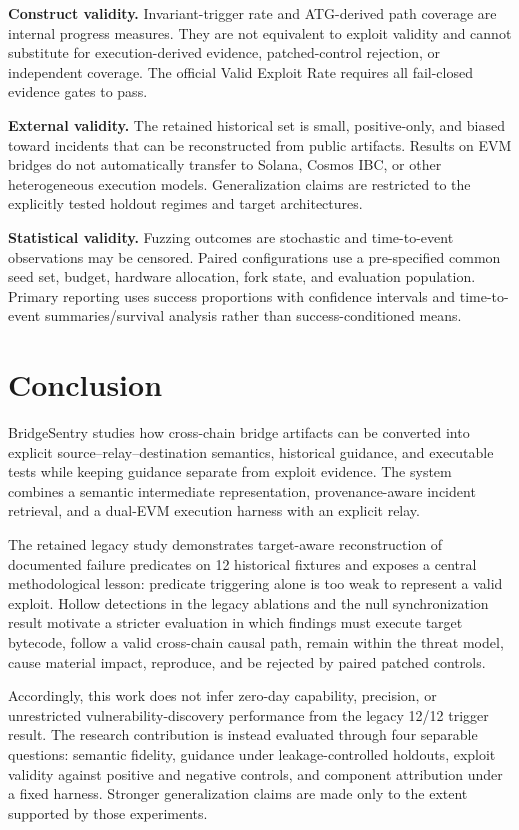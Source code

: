\textbf{Construct validity.} Invariant-trigger rate and ATG-derived path coverage are internal progress measures. They are not equivalent to exploit validity and cannot substitute for execution-derived evidence, patched-control rejection, or independent coverage. The official Valid Exploit Rate requires all fail-closed evidence gates to pass.

\textbf{External validity.} The retained historical set is small, positive-only, and biased toward incidents that can be reconstructed from public artifacts. Results on EVM bridges do not automatically transfer to Solana, Cosmos IBC, or other heterogeneous execution models. Generalization claims are restricted to the explicitly tested holdout regimes and target architectures.

\textbf{Statistical validity.} Fuzzing outcomes are stochastic and time-to-event observations may be censored. Paired configurations use a pre-specified common seed set, budget, hardware allocation, fork state, and evaluation population. Primary reporting uses success proportions with confidence intervals and time-to-event summaries/survival analysis rather than success-conditioned means.

\section{Conclusion}\label{sec:conclusion}

BridgeSentry studies how cross-chain bridge artifacts can be converted into explicit source--relay--destination semantics, historical guidance, and executable tests while keeping guidance separate from exploit evidence. The system combines a semantic intermediate representation, provenance-aware incident retrieval, and a dual-EVM execution harness with an explicit relay.

The retained legacy study demonstrates target-aware reconstruction of documented failure predicates on 12 historical fixtures and exposes a central methodological lesson: predicate triggering alone is too weak to represent a valid exploit. Hollow detections in the legacy ablations and the null synchronization result motivate a stricter evaluation in which findings must execute target bytecode, follow a valid cross-chain causal path, remain within the threat model, cause material impact, reproduce, and be rejected by paired patched controls.

Accordingly, this work does not infer zero-day capability, precision, or unrestricted vulnerability-discovery performance from the legacy 12/12 trigger result. The research contribution is instead evaluated through four separable questions: semantic fidelity, guidance under leakage-controlled holdouts, exploit validity against positive and negative controls, and component attribution under a fixed harness. Stronger generalization claims are made only to the extent supported by those experiments.
